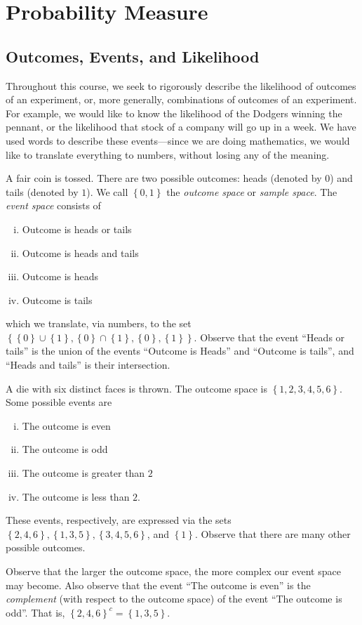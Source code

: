 \chapter{Probability Measure}
\section{Outcomes, Events, and Likelihood}
Throughout this course, we seek to rigorously describe the likelihood of
outcomes of an experiment, or, more generally, combinations of outcomes of an 
experiment.
For example, we would like to know the likelihood of the Dodgers
winning the pennant, or the likelihood that stock of a company will go up
in a week. We have used words to describe these events---since we are doing
mathematics, we would like to translate everything to numbers, without losing
any of the meaning.
\begin{example}
	A fair coin is tossed. There are two possible outcomes: heads (denoted by 
	$0$) 
	and tails (denoted by $1$). We call $ \left\{ 0,1 \right\} $ the 
	\emph{outcome
	space} or \emph{sample space}. The \emph{event space} consists of
	\begin{enumerate}[(i)]
		\item Outcome is heads or tails
		\item Outcome is heads and tails
		\item Outcome is heads
		\item Outcome is tails
	\end{enumerate}
	which we translate, via numbers, to the set $ \left\{ \left\{ 0 \right\} 
		\cup
		\left\{ 1 \right\}, \left\{ 0 \right\} \cap \left\{ 1 \right\} , \left\{ 0
	\right\} , \left\{ 1 \right\} \right \}$.
	Observe that the event ``Heads or tails'' is the union of the events
	``Outcome is Heads'' and ``Outcome is tails'', and ``Heads and tails'' is
	their intersection.
\end{example}	

\begin{example}
	A die with six distinct faces is thrown. The outcome space is
	$ \left\{ 1, 2, 3, 4, 5, 6 \right\} $. Some possible events are
	\begin{enumerate}[(i)]
		\item The outcome is even
		\item The outcome is odd
		\item The outcome is greater than $2$
		\item The outcome is less than $2$.
	\end{enumerate}
	These events, respectively, are expressed via the sets
	$ \left\{ 2, 4, 6 \right\} , \left\{ 1,3,5 \right\} , \left\{ 3, 4, 5, 6
	\right\}$, and $\left\{ 1 \right\}$.
	Observe that there are many other possible outcomes.
\end{example}
Observe that the larger the outcome space, the more complex
our event space may become. Also observe that the event
``The outcome is even'' is the \emph{complement} (with respect to the
outcome space) of
the event ``The outcome is odd''. That is,
${\left\{ 2,4,6 \right\}}^c
= \left\{ 1,3,5 \right\}$.

